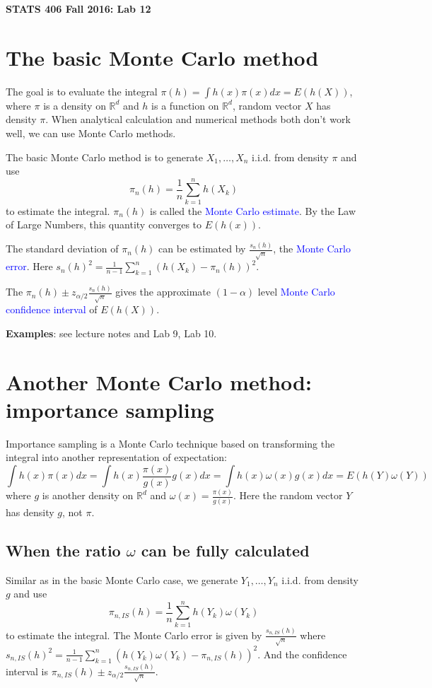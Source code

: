 \documentclass[12pt]{article}
\begin{document}
\begin{center}
\bf
\LARGE
STATS 406 Fall 2016: Lab 12
\end{center}

\section{The basic Monte Carlo method}
The goal is to evaluate the integral $\pi(h)=\int h(x)\pi(x)dx=E(h(X))$, where $\pi$ is a density on $\mathbb{R}^d$ and $h$ is a function on $\mathbb{R}^d$, random vector $X$ has density $\pi$. When analytical calculation and numerical methods both don't work well, we can use Monte Carlo methods.

The basic Monte Carlo method is to generate $X_1,\ldots,X_n$ i.i.d. from density $\pi$ and use $$\pi_n(h)=\frac{1}{n}\sum_{k=1}^{n}h(X_k)$$ to estimate the integral. $\pi_n(h)$ is called the \textcolor{blue}{Monte Carlo estimate}. By the Law of Large Numbers, this quantity converges to $E(h(x))$. 

The standard deviation of $\pi_n(h)$ can be estimated by $\frac{s_n(h)}{\sqrt{n}}$, the \textcolor{blue}{Monte Carlo error}. Here $s_n(h)^2=\frac{1}{n-1}\sum_{k=1}^n(h(X_k)-\pi_n(h))^2$.

The $\pi_n(h) \pm z_{\alpha/2}\frac{s_n(h)}{\sqrt{n}}$ gives the approximate $(1-\alpha)$ level \textcolor{blue}{Monte Carlo confidence interval} of $E(h(X))$.

\textbf{Examples}: see lecture notes and Lab 9, Lab 10.

\section{Another Monte Carlo method: importance sampling}

Importance sampling is a Monte Carlo technique based on transforming the integral into another representation of expectation: $$\int h(x)\pi(x) dx = \int h(x)\frac{\pi(x)}{g(x)}g(x) dx = \int h(x)\omega(x)g(x) dx = E(h(Y)\omega(Y))$$ where $g$ is another density on $\mathbb{R}^d$ and $\omega(x) = \frac{\pi(x)}{g(x)}$. Here the random vector $Y$ has density $g$, not $\pi$.

\subsection*{When the ratio $\omega$ can be fully calculated}
Similar as in the basic Monte Carlo case, we generate $Y_1,\ldots,Y_n$ i.i.d. from density $g$ and use $$\pi_{n,IS}(h)=\frac{1}{n}\sum_{k=1}^{n}h(Y_k)\omega(Y_k)$$ to estimate the integral. The Monte Carlo error is given by $\frac{s_{n,IS}(h)}{\sqrt{n}}$ where $s_{n,IS}(h)^2  = \frac{1}{n-1}\sum_{k=1}^n(h(Y_k)\omega(Y_k)-\pi_{n,IS}(h))^2$. And the confidence interval is $\pi_{n,IS}(h) \pm z_{\alpha/2}\frac{s_{n,IS}(h)}{\sqrt{n}}$.
\end{document}
